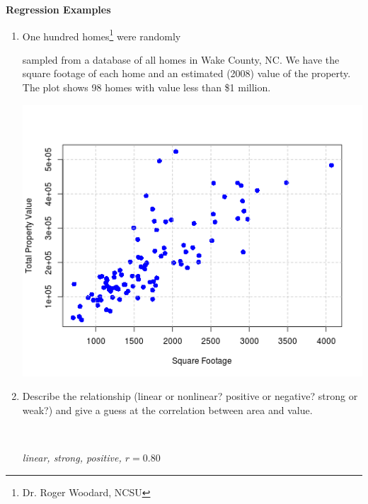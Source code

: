 \def\theTopic{Regression Examples }
\def\dayNum{19 }

\begin{center}
{\bf {\large Regression Examples}}
\end{center}

\begin{enumerate}
\item One hundred homes\footnote{Dr. Roger
    Woodard, NCSU } were randomly \vspace{-.24in}\\ 
  \begin{minipage}{.35\linewidth} 
  sampled from a database of all
  homes in Wake County, NC.  We
  have the square footage of each home and an estimated (2008) value of
  the property.  The plot shows 98 homes with value less than \$1
  million.  \vspace*{1in}
  \end{minipage}\hfill
  \begin{minipage}{.60\linewidth}
    \includegraphics[width = \linewidth]{./plots/WakeCtyHomes.png}
  \end{minipage}
  \item  Describe the relationship (linear or nonlinear? positive or
    negative? strong or weak?) and give a guess at the correlation
    between area and value.
\begin{students}
 \vspace{2cm}\\
\end{students}

\begin{key}
  {\it linear, strong, positive, $r = 0.80$ }
\end{key}


\end{enumerate}
